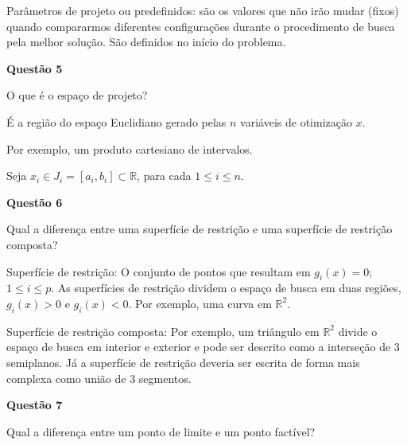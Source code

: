 \documentclass{rbfin}
\begin{document}
Parâmetros de projeto ou predefinidos: são os valores que não irão
mudar (fixos) quando compararmos diferentes configurações durante
o procedimento de busca pela melhor solução. São definidos no início
do problema.

\vspace{6mm}

\large

\textbf{Questão 5}

\normalsize

\vspace{6mm}

O que é o espaço de projeto?

\vspace{3mm}

É a região do espaço Euclidiano gerado pelas $n$ variáveis de otimização $x$.

Por exemplo, um produto cartesiano de intervalos.

Seja $x_i \in J_i = [a_i, b_i] \subset \mathbb{R}$, para cada $1 \le i \le n$.

\newpage

\large

\textbf{Questão 6}

\normalsize

\vspace{6mm}

Qual a diferença entre uma superfície de restrição e uma superfície de restrição
composta?

\vspace{3mm}

Superfície de restrição: O conjunto de pontos que resultam em $g_i(x) = 0$; $1 \le i \le p$. As superfícies de restrição dividem o
espaço de busca em duas regiões, $g_i(x) > 0$ e $g_i(x) < 0$. Por exemplo, uma curva em $\mathbb{R}^2$.

Superfície de restrição composta: Por exemplo, um triângulo em $\mathbb{R}^2$ divide o espaço de busca em interior e exterior e pode ser descrito como a interseção de 3 semiplanos.
Já a superfície de restrição deveria ser escrita de forma mais complexa como união de 3 segmentos.

\vspace{6mm}

\large

\textbf{Questão 7}

\normalsize

\vspace{6mm}

Qual a diferença entre um ponto de limite e um ponto factível?
\end{document}
